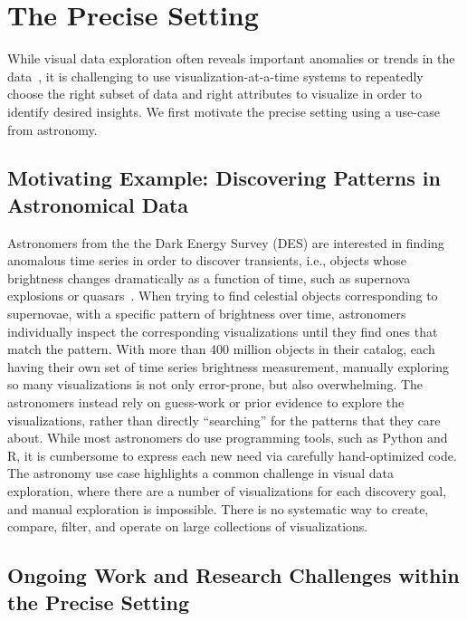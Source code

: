 
\section{The Precise Setting}\label{sec:precise}
While visual data exploration often reveals 
important anomalies or trends 
in the data~\cite{Heer2012,Morton2014}, 
it is challenging to 
use visualization-at-a-time systems to 
repeatedly choose the right subset of 
data and right attributes to visualize
in order to identify desired insights.
We first motivate
the precise setting using a use-case from
astronomy.

\subsection{Motivating Example: Discovering Patterns in Astronomical Data}
Astronomers from the the Dark Energy Survey (DES) 
are interested in finding 
anomalous time series 
in order to discover 
transients, 
i.e., objects whose brightness 
changes dramatically as a function of time, 
such as supernova explosions or quasars~\cite{Drlica-Wagner2017}. 
When trying to find celestial objects 
corresponding to supernovae, 
with a specific pattern of brightness over time, 
astronomers individually inspect the corresponding 
visualizations until 
they find ones that match the pattern. 
With more than 400 million objects in their catalog, 
each having their own set of time series brightness measurement, 
manually exploring so many 
visualizations is not only error-prone, 
but also overwhelming.
The astronomers instead rely on guess-work 
or prior evidence to explore the visualizations,
rather than directly ``searching'' for the patterns
that they care about. 
While most astronomers do use 
programming tools, such as Python and R,
it is cumbersome to express each new need
via carefully hand-optimized code. 
The astronomy use case highlights a 
common challenge in visual data exploration,
where there are a number of visualizations
for each discovery goal,
and manual exploration is impossible.
There is no systematic way to create, compare, filter,
and operate on large collections of visualizations.

\subsection{Ongoing Work and Research Challenges within the Precise Setting}

